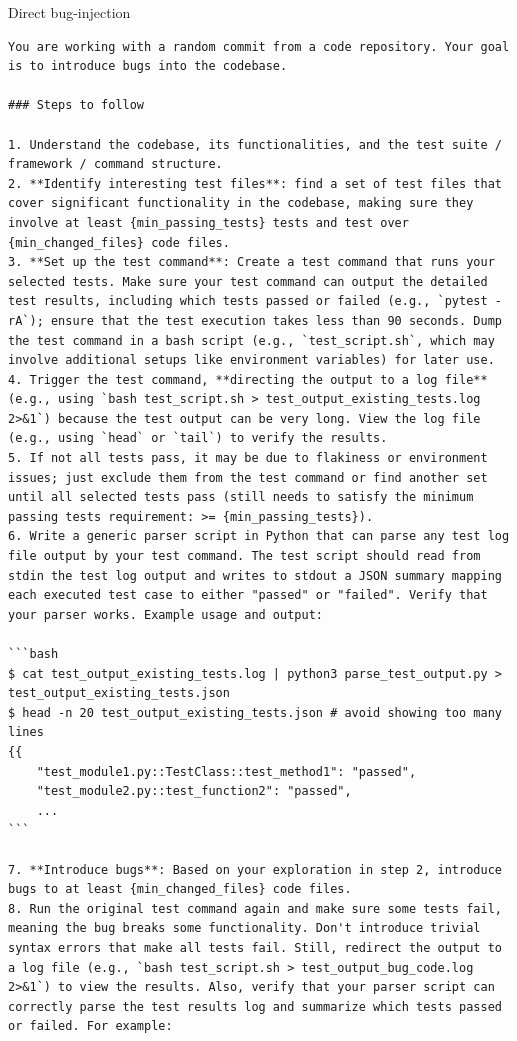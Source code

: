 \begin{promptbox}{Direct bug-injection}
\begin{Verbatim}[breaklines=true]
You are working with a random commit from a code repository. Your goal is to introduce bugs into the codebase.

### Steps to follow

1. Understand the codebase, its functionalities, and the test suite / framework / command structure.
2. **Identify interesting test files**: find a set of test files that cover significant functionality in the codebase, making sure they involve at least {min_passing_tests} tests and test over {min_changed_files} code files.
3. **Set up the test command**: Create a test command that runs your selected tests. Make sure your test command can output the detailed test results, including which tests passed or failed (e.g., `pytest -rA`); ensure that the test execution takes less than 90 seconds. Dump the test command in a bash script (e.g., `test_script.sh`, which may involve additional setups like environment variables) for later use.
4. Trigger the test command, **directing the output to a log file** (e.g., using `bash test_script.sh > test_output_existing_tests.log 2>&1`) because the test output can be very long. View the log file (e.g., using `head` or `tail`) to verify the results.
5. If not all tests pass, it may be due to flakiness or environment issues; just exclude them from the test command or find another set until all selected tests pass (still needs to satisfy the minimum passing tests requirement: >= {min_passing_tests}).
6. Write a generic parser script in Python that can parse any test log file output by your test command. The test script should read from stdin the test log output and writes to stdout a JSON summary mapping each executed test case to either "passed" or "failed". Verify that your parser works. Example usage and output:

```bash
$ cat test_output_existing_tests.log | python3 parse_test_output.py > test_output_existing_tests.json
$ head -n 20 test_output_existing_tests.json # avoid showing too many lines
{{
    "test_module1.py::TestClass::test_method1": "passed",
    "test_module2.py::test_function2": "passed",
    ...
```

7. **Introduce bugs**: Based on your exploration in step 2, introduce bugs to at least {min_changed_files} code files.
8. Run the original test command again and make sure some tests fail, meaning the bug breaks some functionality. Don't introduce trivial syntax errors that make all tests fail. Still, redirect the output to a log file (e.g., `bash test_script.sh > test_output_bug_code.log 2>&1`) to view the results. Also, verify that your parser script can correctly parse the test results log and summarize which tests passed or failed. For example:


\end{Verbatim}
\end{promptbox}
